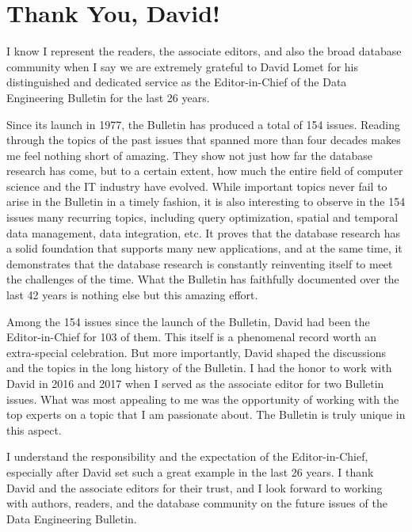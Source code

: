 \documentclass[11pt]{article}
\begin{document}
\section*{Thank You, David!}

I know I represent the readers, the associate editors, and also the
broad database community when I say we are extremely grateful to David
Lomet for his distinguished and dedicated service as the
Editor-in-Chief of the Data Engineering Bulletin for the last 26
years.

Since its launch in 1977, the Bulletin has produced a total of 154
issues. Reading through the topics of the past issues that spanned
more than four decades makes me feel nothing short of amazing. They
show not just how far the database research has come, but to a certain
extent, how much the entire field of computer science and the IT
industry have evolved. While important topics never fail to arise in
the Bulletin in a timely fashion, it is also interesting to observe in
the 154 issues many recurring topics, including query optimization,
spatial and temporal data management, data integration, etc. It proves
that the database research has a solid foundation that supports many
new applications, and at the same time, it demonstrates that the
database research is constantly reinventing itself to meet the
challenges of the time. What the Bulletin has faithfully documented
over the last 42 years is nothing else but this amazing effort.

Among the 154 issues since the launch of the Bulletin, David had been
the Editor-in-Chief for 103 of them. This itself is a phenomenal
record worth an extra-special celebration. But more importantly, David
shaped the discussions and the topics in the long history of the
Bulletin.  I had the honor to work with David in 2016 and 2017 when I
served as the associate editor for two Bulletin issues. What was most
appealing to me was the opportunity of working with the top experts on
a topic that I am passionate about. The Bulletin is truly unique in
this aspect.

I understand the responsibility and the expectation of the
Editor-in-Chief, especially after David set such a great example in
the last 26 years. I thank David and the associate editors for their
trust, and I look forward to working with authors, readers, and the
database community on the future issues of the Data Engineering
Bulletin.

\end{document}
